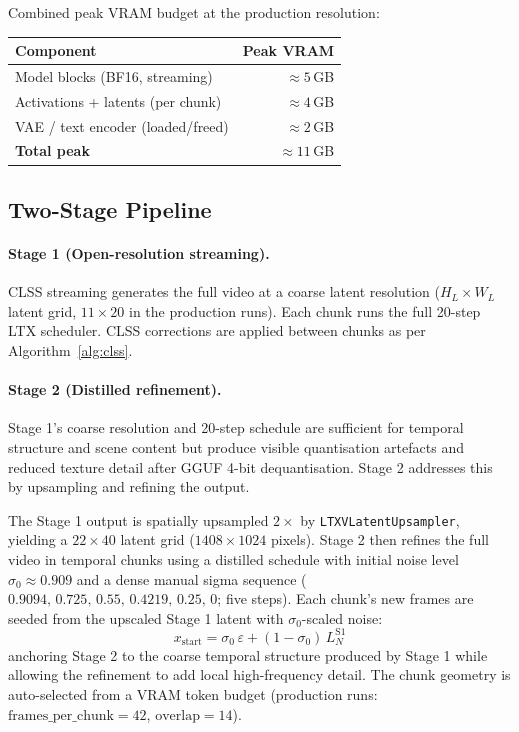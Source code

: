 \documentclass[12pt]{article}
\begin{document}
Combined peak VRAM budget at the production resolution:
\begin{center}
\begin{tabular}{lr}
\toprule
Component & Peak VRAM \\
\midrule
Model blocks (BF16, streaming) & $\approx5$\,GB \\
Activations + latents (per chunk) & $\approx4$\,GB \\
VAE / text encoder (loaded/freed) & $\approx2$\,GB \\
\midrule
\textbf{Total peak} & $\approx11$\,GB \\
\bottomrule
\end{tabular}
\end{center}

\subsection{Two-Stage Pipeline}
\label{sec:twostage}

\paragraph{Stage 1 (Open-resolution streaming).}
CLSS streaming generates the full video at a coarse latent resolution
($H_L \times W_L$ latent grid, $11\times20$ in the production runs).  Each
chunk runs the full 20-step LTX scheduler.  CLSS corrections are applied
between chunks as per Algorithm~\ref{alg:clss}.

\paragraph{Stage 2 (Distilled refinement).}
Stage 1's coarse resolution and 20-step schedule are sufficient for temporal
structure and scene content but produce visible quantisation artefacts and
reduced texture detail after GGUF 4-bit dequantisation.  Stage 2 addresses
this by upsampling and refining the output.

The Stage 1 output is spatially upsampled $2\times$ by
\texttt{LTXVLatentUpsampler}, yielding a $22\times40$ latent grid
($1408\times1024$ pixels).  Stage 2 then refines the full video in temporal
chunks using a distilled schedule with initial noise level
$\sigma_0 \approx 0.909$ and a dense manual sigma sequence
($0.9094,\,0.725,\,0.55,\,0.4219,\,0.25,\,0$; five steps).  Each chunk's new
frames are seeded from the upscaled Stage 1 latent with $\sigma_0$-scaled
noise:
\begin{equation}
x_{\text{start}} = \sigma_0\,\varepsilon + (1-\sigma_0)\,L_N^{\text{S1}}
\end{equation}
anchoring Stage 2 to the coarse temporal structure produced by Stage 1 while
allowing the refinement to add local high-frequency detail.  The chunk
geometry is auto-selected from a VRAM token budget (production runs:
$\text{frames\_per\_chunk}=42$, $\text{overlap}=14$).
\end{document}
